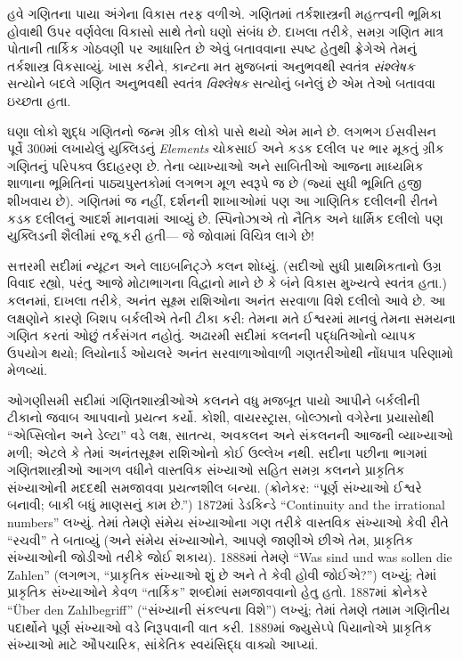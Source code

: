 \documentclass[../../../include/open-logic-section]{subfiles}
\begin{document}
હવે ગણિતના પાયા અંગેના વિકાસ તરફ વળીએ. ગણિતમાં
તર્કશાસ્ત્રની મહત્ત્વની ભૂમિકા હોવાથી ઉપર વર્ણવેલા
વિકાસો સાથે તેનો ઘણો સંબંધ છે. દાખલા તરીકે, સમગ્ર
ગણિત માત્ર પોતાની તાર્કિક ગોઠવણી પર આધારિત છે એવું
બતાવવાના સ્પષ્ટ હેતુથી ફ્રેગેએ તેમનું તર્કશાસ્ત્ર
વિકસાવ્યું. ખાસ કરીને, કાન્ટના મત મુજબનાં અનુભવથી
સ્વતંત્ર \emph{સંશ્લેષક} સત્યોને બદલે ગણિત અનુભવથી
સ્વતંત્ર \emph{વિશ્લેષક} સત્યોનું બનેલું છે એમ તેઓ બતાવવા ઇચ્છતા હતા.

ઘણા લોકો શુદ્ધ ગણિતનો જન્મ ગ્રીક લોકો પાસે થયો એમ
માને છે. લગભગ ઈસવીસન પૂર્વે 300માં લખાયેલું યુક્લિડનું
\emph{Elements} ચોકસાઈ અને કડક દલીલ પર ભાર મૂકતું
ગ્રીક ગણિતનું પરિપક્વ ઉદાહરણ છે. તેના વ્યાખ્યાઓ અને
સાબિતીઓ આજના માધ્યમિક શાળાના ભૂમિતિનાં પાઠ્યપુસ્તકોમાં
લગભગ મૂળ સ્વરૂપે જ છે (જ્યાં સુધી ભૂમિતિ હજી શીખવાય છે).
ગણિતમાં જ નહીં, દર્શનની શાખાઓમાં પણ આ ગાણિતિક દલીલની
રીતને કડક દલીલનું આદર્શ માનવામાં આવ્યું છે. સ્પિનોઝાએ તો
નૈતિક અને ધાર્મિક દલીલો પણ યુક્લિડની શૈલીમાં રજૂ કરી હતી—
જે જોવામાં વિચિત્ર લાગે છે!

સત્તરમી સદીમાં ન્યૂટન અને લાઇબનિટ્ઝે કલન શોધ્યું.
(સદીઓ સુધી પ્રાથમિકતાનો ઉગ્ર વિવાદ રહ્યો, પરંતુ આજે
મોટાભાગના વિદ્વાનો માને છે કે બંને વિકાસ મુખ્યત્વે
સ્વતંત્ર હતા.) કલનમાં, દાખલા તરીકે, અનંત સૂક્ષ્મ
રાશિઓના અનંત સરવાળા વિશે દલીલો આવે છે. આ લક્ષણોને
કારણે બિશપ બર્કલીએ તેની ટીકા કરી: તેમના મતે ઈશ્વરમાં
માનવું તેમના સમયના ગણિત કરતાં ઓછું તર્કસંગત નહોતું.
અઢારમી સદીમાં કલનની પદ્ધતિઓનો વ્યાપક ઉપયોગ થયો;
લિયોનાર્ડ ઓયલરે અનંત સરવાળાઓવાળી ગણતરીઓથી નોંધપાત્ર
પરિણામો મેળવ્યાં.

ઓગણીસમી સદીમાં ગણિતશાસ્ત્રીઓએ કલનને વધુ મજબૂત પાયો
આપીને બર્કલીની ટીકાનો જવાબ આપવાનો પ્રયત્ન કર્યો.
કોશી, વાયરસ્ટ્રાસ, બોલ્ઝાનો વગેરેના પ્રયાસોથી
``એપ્સિલોન અને ડેલ્ટા'' વડે લક્ષ, સાતત્ય,
અવકલન અને સંકલનની આજની વ્યાખ્યાઓ મળી; એટલે કે
તેમાં અનંતસૂક્ષ્મ રાશિઓનો કોઈ ઉલ્લેખ નથી. સદીના
પછીના ભાગમાં ગણિતશાસ્ત્રીઓ આગળ વધીને વાસ્તવિક
સંખ્યાઓ સહિત સમગ્ર કલનને પ્રાકૃતિક સંખ્યાઓની મદદથી
સમજાવવા પ્રયત્નશીલ બન્યા. (ક્રોનેકર: ``પૂર્ણ સંખ્યાઓ
ઈશ્વરે બનાવી; બાકી બધું માણસનું કામ છે.'') 1872માં
ડેડકિન્ડે ``Continuity and the irrational numbers''
લખ્યું. તેમાં તેમણે સંમેય સંખ્યાઓના ગણ તરીકે વાસ્તવિક
સંખ્યાઓ કેવી રીતે ``રચવી'' તે બતાવ્યું (અને સંમેય
સંખ્યાઓને, આપણે જાણીએ છીએ તેમ, પ્રાકૃતિક સંખ્યાઓની
જોડીઓ તરીકે જોઈ શકાય). 1888માં તેમણે ``Was sind und
was sollen die Zahlen'' (લગભગ, ``પ્રાકૃતિક સંખ્યાઓ
શું છે અને તે કેવી હોવી જોઈએ?'') લખ્યું; તેમાં
પ્રાકૃતિક સંખ્યાઓને કેવળ ``તાર્કિક'' શબ્દોમાં સમજાવવાનો
હેતુ હતો. 1887માં ક્રોનેકરે ``\"Uber den Zahlbegriff''
(``સંખ્યાની સંકલ્પના વિશે'') લખ્યું; તેમાં તેમણે તમામ
ગણિતીય પદાર્થોને પૂર્ણ સંખ્યાઓ વડે નિરૂપવાની વાત કરી.
1889માં જ્યુસેપ્પે પિયાનોએ પ્રાકૃતિક સંખ્યાઓ માટે
ઔપચારિક, સાંકેતિક સ્વયંસિદ્ધ વાક્યો આપ્યાં.
\end{document}
